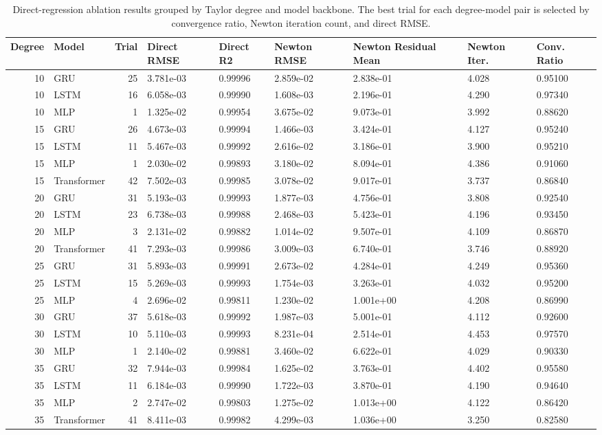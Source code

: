 \begin{table}
\caption{Direct-regression ablation results grouped by Taylor degree and model backbone. The best trial for each degree-model pair is selected by convergence ratio, Newton iteration count, and direct RMSE.}
\label{tab:direct_regression_by_degree_model}
\begin{tabular}{rlrllllll}
\toprule
Degree & Model & Trial & Direct RMSE & Direct R2 & Newton RMSE & Newton Residual Mean & Newton Iter. & Conv. Ratio \\
\midrule
10 & GRU & 25 & 3.781e-03 & 0.99996 & 2.859e-02 & 2.838e-01 & 4.028 & 0.95100 \\
10 & LSTM & 16 & 6.058e-03 & 0.99990 & 1.608e-03 & 2.196e-01 & 4.290 & 0.97340 \\
10 & MLP & 1 & 1.325e-02 & 0.99954 & 3.675e-02 & 9.073e-01 & 3.992 & 0.88620 \\
15 & GRU & 26 & 4.673e-03 & 0.99994 & 1.466e-03 & 3.424e-01 & 4.127 & 0.95240 \\
15 & LSTM & 11 & 5.467e-03 & 0.99992 & 2.616e-02 & 3.186e-01 & 3.900 & 0.95210 \\
15 & MLP & 1 & 2.030e-02 & 0.99893 & 3.180e-02 & 8.094e-01 & 4.386 & 0.91060 \\
15 & Transformer & 42 & 7.502e-03 & 0.99985 & 3.078e-02 & 9.017e-01 & 3.737 & 0.86840 \\
20 & GRU & 31 & 5.193e-03 & 0.99993 & 1.877e-03 & 4.756e-01 & 3.808 & 0.92540 \\
20 & LSTM & 23 & 6.738e-03 & 0.99988 & 2.468e-03 & 5.423e-01 & 4.196 & 0.93450 \\
20 & MLP & 3 & 2.131e-02 & 0.99882 & 1.014e-02 & 9.507e-01 & 4.109 & 0.86870 \\
20 & Transformer & 41 & 7.293e-03 & 0.99986 & 3.009e-03 & 6.740e-01 & 3.746 & 0.88920 \\
25 & GRU & 31 & 5.893e-03 & 0.99991 & 2.673e-02 & 4.284e-01 & 4.249 & 0.95360 \\
25 & LSTM & 15 & 5.269e-03 & 0.99993 & 1.754e-03 & 3.263e-01 & 4.032 & 0.95200 \\
25 & MLP & 4 & 2.696e-02 & 0.99811 & 1.230e-02 & 1.001e+00 & 4.208 & 0.86990 \\
30 & GRU & 37 & 5.618e-03 & 0.99992 & 1.987e-03 & 5.001e-01 & 4.112 & 0.92600 \\
30 & LSTM & 10 & 5.110e-03 & 0.99993 & 8.231e-04 & 2.514e-01 & 4.453 & 0.97570 \\
30 & MLP & 1 & 2.140e-02 & 0.99881 & 3.460e-02 & 6.622e-01 & 4.029 & 0.90330 \\
35 & GRU & 32 & 7.944e-03 & 0.99984 & 1.625e-02 & 3.763e-01 & 4.402 & 0.95580 \\
35 & LSTM & 11 & 6.184e-03 & 0.99990 & 1.722e-03 & 3.870e-01 & 4.190 & 0.94640 \\
35 & MLP & 2 & 2.747e-02 & 0.99803 & 1.275e-02 & 1.013e+00 & 4.122 & 0.86420 \\
35 & Transformer & 41 & 8.411e-03 & 0.99982 & 4.299e-03 & 1.036e+00 & 3.250 & 0.82580 \\
\bottomrule
\end{tabular}
\end{table}
